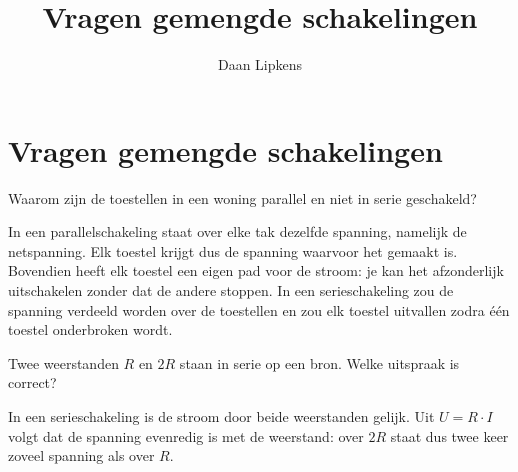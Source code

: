 \documentclass{ximera}
\title{Vragen gemengde schakelingen}
\author{Daan Lipkens}
\begin{document}
\begin{abstract}
\end{abstract}
\maketitle
\label{vragen:schakelingen}
\section{Vragen gemengde schakelingen}
\begin{question}
    Waarom zijn de toestellen in een woning parallel en niet in serie geschakeld?

    \begin{solution}\nl
        In een parallelschakeling staat over elke tak dezelfde spanning, namelijk de netspanning. Elk toestel krijgt dus de spanning waarvoor het gemaakt is. Bovendien heeft elk toestel een eigen pad voor de stroom: je kan het afzonderlijk uitschakelen zonder dat de andere stoppen. In een serieschakeling zou de spanning verdeeld worden over de toestellen en zou elk toestel uitvallen zodra één toestel onderbroken wordt.
    \end{solution}
\end{question}

\begin{question}
    Twee weerstanden $R$ en $2R$ staan in serie op een bron. Welke uitspraak is correct?
    \begin{multipleChoice}
    \end{multipleChoice}

    \begin{solution}\nl
        In een serieschakeling is de stroom door beide weerstanden gelijk. Uit $U = R \cdot I$ volgt dat de spanning evenredig is met de weerstand: over $2R$ staat dus twee keer zoveel spanning als over $R$.
    \end{solution}
\end{question}
\end{document}
